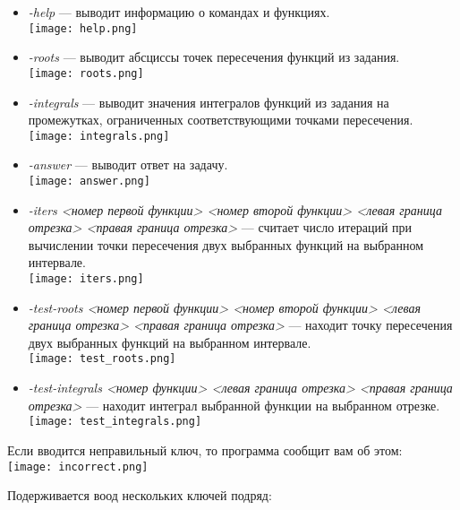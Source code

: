 \documentclass[a4paper,12pt,titlepage,finall]{article}
\begin{document}
\begin{itemize}
    \item \textsl{-help} ---  выводит информацию о командах и функциях.\\
    
    \texttt{[image: help.png]}
    \item \textsl{-roots} --- выводит абсциссы точек пересечения функций из задания.\\
    
    \texttt{[image: roots.png]}
    \item \textsl{-integrals} --- выводит значения интегралов функций из задания на промежутках, ограниченных соответствующими точками пересечения.\\
    
    \texttt{[image: integrals.png]}
    \item \textsl{-answer} --- выводит ответ на задачу.\\
    
    \texttt{[image: answer.png]}
    \item \textsl{-iters <номер первой функции> <номер второй функции> <левая граница отрезка> <правая граница отрезка>} --- считает число итераций при вычислении точки пересечения двух выбранных функций на выбранном интервале.\\

    \texttt{[image: iters.png]}
    \item \textsl{-test-roots <номер первой функции> <номер второй функции> <левая граница отрезка> <правая граница отрезка>} --- находит точку пересечения двух выбранных функций на выбранном интервале.\\

    \texttt{[image: test\_roots.png]}
    \item \textsl{-test-integrals <номер функции> <левая граница отрезка> <правая граница отрезка>} --- находит интеграл выбранной функции на выбранном отрезке.\\

    \texttt{[image: test\_integrals.png]}
\end{itemize}

Если вводится неправильный ключ, то программа сообщит вам об этом:\\

\texttt{[image: incorrect.png]}

Подерживается воод нескольких ключей подряд:\\
\end{document}
